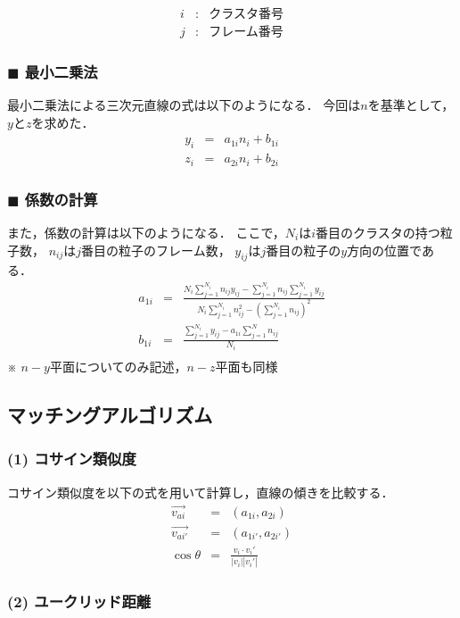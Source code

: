 \documentclass[twocolumn,a4j]{jsarticle}
\begin{document}
\begin{eqnarray*}
  i &:& \text{クラスタ番号}\\
  j &:& \text{フレーム番号}
\end{eqnarray*}

\subsubsection*{$\blacksquare$ 最小二乗法}
最小二乗法による三次元直線の式は以下のようになる．
今回は$n$を基準として，$y$と$z$を求めた．
\begin{eqnarray*}
  y_i &=& a_{1i}n_i + b_{1i}\\
  z_i &=& a_{2i}n_i + b_{2i}
\end{eqnarray*}

\subsubsection*{$\blacksquare$ 係数の計算}
また，係数の計算は以下のようになる．
ここで，$N_i$は$i$番目のクラスタの持つ粒子数，
$n_{ij}$は$j$番目の粒子のフレーム数，
$y_{ij}$は$j$番目の粒子の$y$方向の位置である．
\begin{eqnarray*}
  a_{1i} &=& \frac{N_i \sum_{j=1}^{N_i} n_{ij} y_{ij} - \sum_{j=1}^{N_i} n_{ij} \sum_{j=1}^{N_i} y_{ij}}{N_i \sum_{j=1}^{N_i} n_{ij}^2 - (\sum_{j=1}^{N_i} n_{ij})^2}\\
  b_{1i} &=& \frac{\sum_{j=1}^{N_i} y_{ij} - a_{1i} \sum_{j=1}^{N} n_{ij}}{N_i}\\
\end{eqnarray*}
※ $n-y$平面についてのみ記述，$n-z$平面も同様\\

\subsection{マッチングアルゴリズム}
\subsubsection*{(1) コサイン類似度}
コサイン類似度を以下の式を用いて計算し，直線の傾きを比較する．
\begin{eqnarray*}
  \vec{v_{ai} }&=& (a_{1i}, a_{2i})\\
  \vec{v_{ai'}} &=& (a_{1i'}, a_{2i'})\\
  \cos \theta &=& \frac{v_i \cdot v_i'}{|v_i||v_i'|}
\end{eqnarray*}

\subsubsection*{(2) ユークリッド距離}
\end{document}

